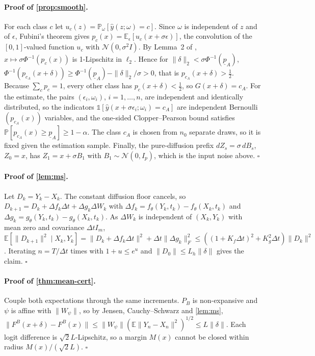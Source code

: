 \documentclass{article}
\theoremstyle{definition}
\newcommand{\Exp}{\mathbb{E}}
\newcommand{\Prob}{\mathbb{P}}
\begin{document}
\paragraph{Proof of \cref{prop:smooth}.} For each class $c$ let
$u_c(z)=\Prob_\omega[\hat y(z;\omega)=c]$. Since $\omega$ is independent of $z$
and of $\epsilon$, Fubini's theorem gives
$p_c(x)=\Exp_\epsilon[u_c(x+\sigma\epsilon)]$, the convolution of the
$[0,1]$-valued function $u_c$ with $\mathcal N(0,\sigma^2I)$. By Lemma~2 of
\citet{salman2019smoothadv}, $x\mapsto\sigma\Phi^{-1}(p_c(x))$ is 1-Lipschitz in
$\ell_2$. Hence for $\|\delta\|_2<\sigma\Phi^{-1}(\underline p_A)$,
$\Phi^{-1}(p_{c_A}(x+\delta))\ge\Phi^{-1}(\underline p_A)-\|\delta\|_2/\sigma>0$,
that is $p_{c_A}(x+\delta)>\tfrac12$. Because $\sum_cp_c=1$, every other class has
$p_c(x+\delta)<\tfrac12$, so $G(x+\delta)=c_A$. For the estimate, the pairs
$(\epsilon_i,\omega_i)$, $i=1,\dots,n$, are independent and identically
distributed, so the indicators $\mathbb 1[\hat y(x+\sigma\epsilon_i;\omega_i)=c_A]$
are independent Bernoulli$(p_{c_A}(x))$ variables, and the one-sided
Clopper--Pearson bound \citep{clopper1934} satisfies
$\Prob[p_{c_A}(x)\ge\underline p_A]\ge1-\alpha$. The class $c_A$ is chosen from
$n_0$ separate draws, so it is fixed given the estimation sample. Finally, the
pure-diffusion prefix $dZ_s=\sigma\,dB_s$, $Z_0=x$, has $Z_1=x+\sigma B_1$ with
$B_1\sim\mathcal N(0,I_p)$, which is the input noise above. \hfill$\square$

\paragraph{Proof of \cref{lem:ms}.} Let $D_k=Y_k-X_k$. The constant diffusion
floor cancels, so $D_{k+1}=D_k+\Delta f_k\Delta t+\Delta g_k\Delta W_k$ with
$\Delta f_k=f_\theta(Y_k,t_k)-f_\theta(X_k,t_k)$ and
$\Delta g_k=g_\theta(Y_k,t_k)-g_\theta(X_k,t_k)$. As $\Delta W_k$ is independent
of $(X_k,Y_k)$ with mean zero and covariance $\Delta t I_m$,
$\Exp[\|D_{k+1}\|^2\mid X_k,Y_k]=\|D_k+\Delta f_k\Delta t\|^2+\Delta t\|\Delta g_k\|_F^2
\le((1+K_f\Delta t)^2+K_g^2\Delta t)\|D_k\|^2$. Iterating $n=T/\Delta t$ times with
$1+u\le e^u$ and $\|D_0\|\le L_h\|\delta\|$ gives the claim. \hfill$\square$

\paragraph{Proof of \cref{thm:mean-cert}.} Couple both expectations through the
same increments. $P_B$ is non-expansive and $\psi$ is affine with $\|W_\psi\|$,
so by Jensen, Cauchy--Schwarz and \cref{lem:ms},
$\|F^B(x+\delta)-F^B(x)\|\le\|W_\psi\|(\Exp\|Y_n-X_n\|^2)^{1/2}\le L\|\delta\|$.
Each logit difference is $\sqrt2L$-Lipschitz, so a margin $M(x)$ cannot be closed
within radius $M(x)/(\sqrt2L)$. \hfill$\square$
\end{document}
